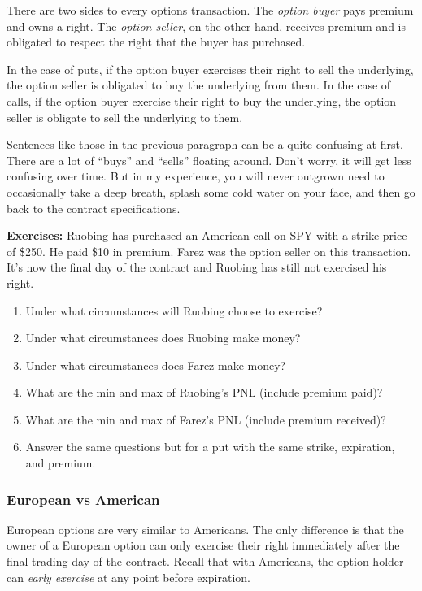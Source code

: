 \documentclass[11pt,]{krantz}
\begin{document}
There are two sides to every options transaction. The \emph{option buyer} pays premium and owns a right. The \emph{option seller}, on the other hand, receives premium and is obligated to respect the right that the buyer has purchased.

In the case of puts, if the option buyer exercises their right to sell the underlying, the option seller is obligated to buy the underlying from them. In the case of calls, if the option buyer exercise their right to buy the underlying, the option seller is obligate to sell the underlying to them.

Sentences like those in the previous paragraph can be a quite confusing at first. There are a lot of ``buys'' and ``sells'' floating around. Don't worry, it will get less confusing over time. But in my experience, you will never outgrown need to occasionally take a deep breath, splash some cold water on your face, and then go back to the contract specifications.

\textbf{Exercises:} Ruobing has purchased an American call on SPY with a strike price of \$250. He paid \$10 in premium. Farez was the option seller on this transaction. It's now the final day of the contract and Ruobing has still not exercised his right.

\begin{enumerate}
\def\labelenumi{\arabic{enumi}.}
\item
  Under what circumstances will Ruobing choose to exercise?
\item
  Under what circumstances does Ruobing make money?
\item
  Under what circumstances does Farez make money?
\item
  What are the min and max of Ruobing's PNL (include premium paid)?
\item
  What are the min and max of Farez's PNL (include premium received)?
\item
  Answer the same questions but for a put with the same strike, expiration, and premium.
\end{enumerate}

\subsubsection*{European vs American}\label{european-vs-american}

European options are very similar to Americans. The only difference is that the owner of a European option can only exercise their right immediately after the final trading day of the contract. Recall that with Americans, the option holder can \emph{early exercise} at any point before expiration.
\end{document}
